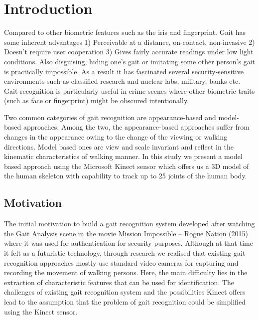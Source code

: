 \chapter{Introduction} \label{Introduction}
\vspace{0.2cm}
\noindent Compared to other biometric features such as the iris and fingerprint. Gait has some inherent advantages
1) Perceivable at a distance, on-contact, non-invasive
2) Doesn’t require user cooperation
3) Gives fairly accurate readings under low light conditions.
Also disguising, hiding one’s gait or imitating some other person’s gait is practically impossible. As a result it has fascinated several security-sensitive environments such as classified research and nuclear labs, military, banks etc. Gait recognition is particularly useful in crime scenes where other biometric traits (such as face or fingerprint) might be obscured intentionally.

\noindent Two common categories of gait recognition are appearance-based and model-based approaches. Among the two, the appearance-based approaches suffer from changes in the appearance owing to the change of the viewing or walking directions. Model based ones are view and scale invariant and reflect in the kinematic characteristics of walking manner. In this study we present a model based approach using the Microsoft Kinect sensor which offers us a 3D model of the human skeleton with capability to track up to 25 joints of the human body.
\section{Motivation}\label{Motivation}
\noindent The initial motivation to build a gait recognition system developed after watching the Gait Analysis scene in the movie Mission Impossible – Rogue Nation (2015) where it was used for authentication for security purposes. Although at that time it felt as a futuristic technology, through research we realised that existing gait recognition approaches mostly use standard video cameras for capturing and recording the movement of walking persons. Here, the main difficulty lies in the extraction of characteristic features that can be used for identification. The challenges of existing gait recognition system and the possibilities Kinect offers lead to the assumption that the problem of gait recognition could be simplified using the Kinect sensor.

